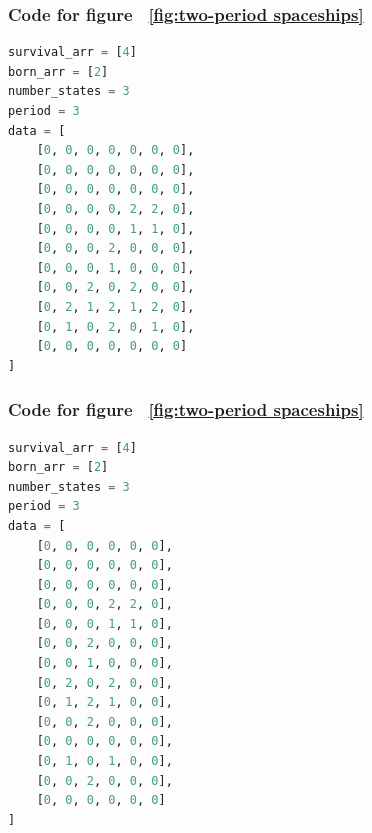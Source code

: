 \documentclass[12pt]{article}
\numberwithin{figure}{section} %
\begin{document}
\noindent\begin{minipage}{.45\textwidth}
\subsubsection{Code for figure ~\ref{fig:two-period spaceships}}
\label{subsubsection:two-period spaceships(4/5)}
\begin{lstlisting}[language = Python]
survival_arr = [4]
born_arr = [2]
number_states = 3
period = 3
data = [
    [0, 0, 0, 0, 0, 0, 0],
    [0, 0, 0, 0, 0, 0, 0],
    [0, 0, 0, 0, 0, 0, 0],
    [0, 0, 0, 0, 2, 2, 0],
    [0, 0, 0, 0, 1, 1, 0],
    [0, 0, 0, 2, 0, 0, 0],
    [0, 0, 0, 1, 0, 0, 0],
    [0, 0, 2, 0, 2, 0, 0],
    [0, 2, 1, 2, 1, 2, 0],
    [0, 1, 0, 2, 0, 1, 0],
    [0, 0, 0, 0, 0, 0, 0]
]
\end{lstlisting}
\end{minipage}\hfill
\begin{minipage}{.45\textwidth}
\subsubsection{Code for figure ~\ref{fig:two-period spaceships}}
\label{subsubsection:two-period spaceships(5/5)}
\begin{lstlisting}[language = Python]
survival_arr = [4]
born_arr = [2]
number_states = 3
period = 3
data = [
    [0, 0, 0, 0, 0, 0],
    [0, 0, 0, 0, 0, 0],
    [0, 0, 0, 0, 0, 0],
    [0, 0, 0, 2, 2, 0],
    [0, 0, 0, 1, 1, 0],
    [0, 0, 2, 0, 0, 0],
    [0, 0, 1, 0, 0, 0],
    [0, 2, 0, 2, 0, 0],
    [0, 1, 2, 1, 0, 0],
    [0, 0, 2, 0, 0, 0],
    [0, 0, 0, 0, 0, 0],
    [0, 1, 0, 1, 0, 0],
    [0, 0, 2, 0, 0, 0],
    [0, 0, 0, 0, 0, 0]
]
\end{lstlisting}
\end{minipage}
\end{document}
